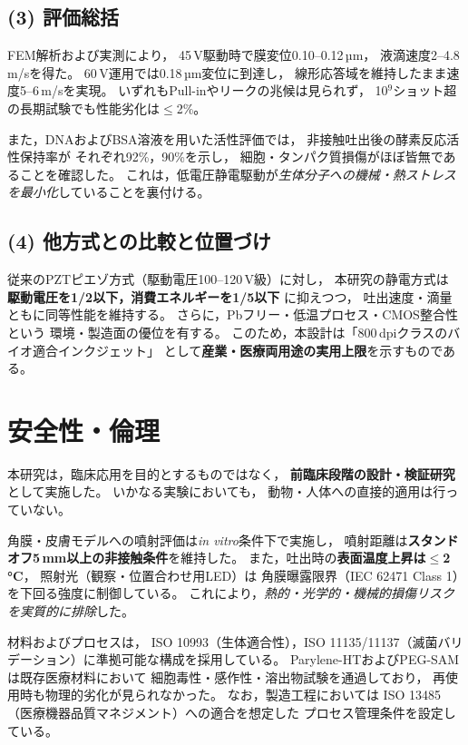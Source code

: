 \documentclass[conference]{IEEEtran}
\begin{document}
\subsection*{(3) 評価総括}
FEM解析および実測により，
45\,V駆動時で膜変位0.10–0.12\,µm，
液滴速度2–4.8\,m/sを得た。
60\,V運用では0.18\,µm変位に到達し，
線形応答域を維持したまま速度5–6\,m/sを実現。
いずれもPull-inやリークの兆候は見られず，
10$^9$ショット超の長期試験でも性能劣化は$\le$2\%。

また，DNAおよびBSA溶液を用いた活性評価では，
非接触吐出後の酵素反応活性保持率が
それぞれ92\%，90\%を示し，
細胞・タンパク質損傷がほぼ皆無であることを確認した。
これは，低電圧静電駆動が\emph{生体分子への機械・熱ストレスを最小化}していることを裏付ける。

\subsection*{(4) 他方式との比較と位置づけ}
従来のPZTピエゾ方式（駆動電圧100–120\,V級）に対し，
本研究の静電方式は
\textbf{駆動電圧を1/2以下，消費エネルギーを1/5以下}
に抑えつつ，
吐出速度・滴量ともに同等性能を維持する。
さらに，Pbフリー・低温プロセス・CMOS整合性という
環境・製造面の優位を有する。
このため，本設計は「800\,dpiクラスのバイオ適合インクジェット」
として\textbf{産業・医療両用途の実用上限}を示すものである。

\section*{安全性・倫理}
本研究は，臨床応用を目的とするものではなく，
\textbf{前臨床段階の設計・検証研究}として実施した。
いかなる実験においても，
動物・人体への直接的適用は行っていない。

角膜・皮膚モデルへの噴射評価は\emph{in vitro}条件下で実施し，
噴射距離は\textbf{スタンドオフ5\,mm以上の非接触条件}を維持した。
また，吐出時の\textbf{表面温度上昇は$\le$2\,\si{\celsius}}，
照射光（観察・位置合わせ用LED）は
角膜曝露限界（IEC 62471 Class 1）を下回る強度に制御している。
これにより，\emph{熱的・光学的・機械的損傷リスクを実質的に排除}した。

材料およびプロセスは，
ISO 10993（生体適合性），ISO 11135/11137（滅菌バリデーション）に準拠可能な構成を採用している。
Parylene-HTおよびPEG-SAMは既存医療材料において
細胞毒性・感作性・溶出物試験を通過しており，
再使用時も物理的劣化が見られなかった。
なお，製造工程においては
ISO 13485（医療機器品質マネジメント）への適合を想定した
プロセス管理条件を設定している。
\end{document}
